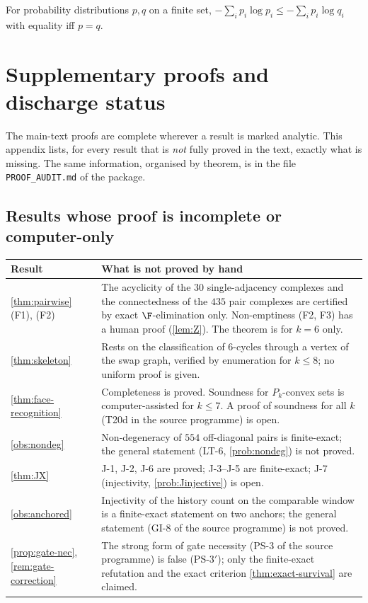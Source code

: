 \begin{lemma}\label{lem:gibbs}
For probability distributions $p,q$ on a finite set, $-\sum_i p_i\log p_i\le-\sum_i p_i\log q_i$ with equality iff $p=q$.
\end{lemma}

\chapter{Supplementary proofs and discharge status}\label{app:proofs}
The main-text proofs are complete wherever a result is marked analytic. This appendix lists, for every result that is \emph{not} fully proved in the text, exactly what is missing. The same information, organised by theorem, is in the file \texttt{PROOF\_AUDIT.md} of the package.

\section{Results whose proof is incomplete or computer-only}
\begin{center}\footnotesize
\begin{tabular}{@{}p{3.1cm}p{9.9cm}@{}}\toprule Result & What is not proved by hand\\\midrule
\cref{thm:pairwise} (F1), (F2) & The acyclicity of the $30$ single-adjacency complexes and the connectedness of the $435$ pair complexes are certified by exact $\F$-elimination only. Non-emptiness (F2, F3) has a human proof (\cref{lem:Z}). The theorem is for $k=6$ only.\\
\cref{thm:skeleton} & Rests on the classification of $6$-cycles through a vertex of the swap graph, verified by enumeration for $k\le8$; no uniform proof is given.\\
\cref{thm:face-recognition} & Completeness is proved. Soundness for $P_k$-convex sets is computer-assisted for $k\le7$. A proof of soundness for all $k$ (T20d in the source programme) is open.\\
\cref{obs:nondeg} & Non-degeneracy of $554$ off-diagonal pairs is finite-exact; the general statement (LT-6, \cref{prob:nondeg}) is not proved.\\
\cref{thm:JX} & J-1, J-2, J-6 are proved; J-3--J-5 are finite-exact; J-7 (injectivity, \cref{prob:Jinjective}) is open.\\
\cref{obs:anchored} & Injectivity of the history count on the comparable window is a finite-exact statement on two anchors; the general statement (GI-8 of the source programme) is not proved.\\
\cref{prop:gate-nec}, \cref{rem:gate-correction} & The strong form of gate necessity (PS-3 of the source programme) is false (PS-3$'$); only the finite-exact refutation and the exact criterion \cref{thm:exact-survival} are claimed.\\
\bottomrule\end{tabular}\end{center}

